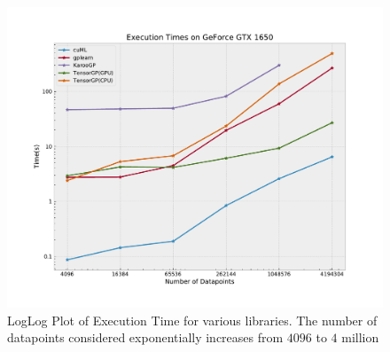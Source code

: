 \begin{figure}[htbp]
  \centering
  \includegraphics[scale=0.55]{images/ExecutionTimes.pdf}
  \caption{LogLog Plot of Execution Time for various libraries. The number of datapoints considered exponentially increases from $4096$ to $4$ million}
  \label{fig:exectimes}
\end{figure}


